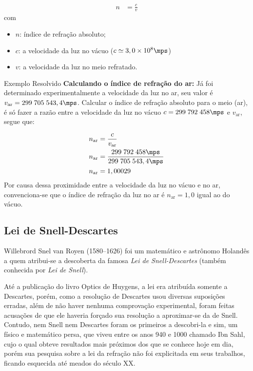 \begin{align}
    n&=\frac{c}{v}
\end{align}
com
\begin{itemize}
    \item $n$: índice de refração absoluto;
    \item $c$: a velocidade da luz no vácuo ($c\simeq 3,0\times 10^8\mps$)
    \item $v$: a velocidade da luz no meio refratado.
\end{itemize}
\begin{mybox}[colback=white, colframe=darkpastelblue,colbacktitle=darkpastelblue!85!darkpastelblue,]{Exemplo Resolvido}
    \textbf{Calculando o índice de refração do ar:} Já foi determinado experimentalmente a velocidade da luz no ar, seu valor é $v_{\mathrm{ar}}=299\;705\;543,4\mps$. Calcular o índice de refração absoluto para o meio (ar), é só fazer a razão entre a velocidade da luz no vácuo $c=299\;792\;458\mps$ e $v_{\mathrm{ar}}$, segue que:

    \tcblower
    \begin{align}
        \begin{split}
            n_{\mathrm{ar}}&=\frac{c}{v_{\mathrm{ar}}}\\
            n_{\mathrm{ar}}&=\frac{299\;792\;458\mps}{299\;705\;543,4\mps}\\
            n_{\mathrm{ar}}&=1,00029\
        \end{split}
    \end{align}
    Por causa dessa proximidade entre a velocidade da luz no vácuo e no ar, convenciona-se que o índice de refração da luz no ar é $n_{\mathrm{ar}}=1,0$ igual ao do vácuo.        
\end{mybox}

\subsection*{Lei de Snell-Descartes}

Willebrord Snel van Royen (1580--1626) foi um matemático e astrônomo Holandês a quem atribui-se a descoberta da famosa \emph{Lei de Snell-Descartes} (também conhecida por \emph{Lei de Snell}).

Até a publicação do livro Optics de Huygens, a lei era atribuída somente a Descartes, porém, como a resolução de Descartes usou diversas suposições erradas, além de não haver nenhuma comprovação experimental, foram feitas acusações de que ele haveria forçado sua resolução a aproximar-se da de Snell. Contudo, nem Snell nem Descartes foram os primeiros a descobri-la e sim, um físico e matemático persa, que viveu entre os anos 940 e 1000 chamado Ibn Sahl, cujo o qual obteve resultados mais próximos dos que se conhece hoje em dia, porém sua pesquisa sobre a lei da refração não foi explicitada em seus trabalhos, ficando esquecida até meados do século XX.        

